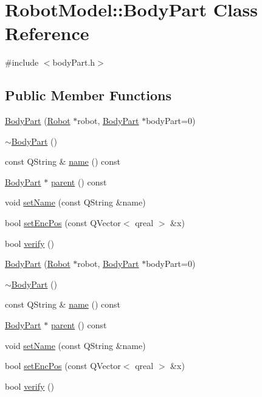 \hypertarget{class_robot_model_1_1_body_part}{
\section{RobotModel::BodyPart Class Reference}
\label{class_robot_model_1_1_body_part}
}


{\ttfamily \#include $<$bodyPart.h$>$}\subsection*{Public Member Functions}
\begin{DoxyCompactItemize}
\item 
\hyperlink{class_robot_model_1_1_body_part_a1f6265932a76d89dc77b0b6185966913}{BodyPart} (\hyperlink{class_robot_model_1_1_robot}{Robot} $\ast$robot, \hyperlink{class_robot_model_1_1_body_part}{BodyPart} $\ast$bodyPart=0)
\item 
\hyperlink{class_robot_model_1_1_body_part_a0d51eaacbf15745175b21bf44f67a92a}{$\sim$BodyPart} ()
\item 
const QString \& \hyperlink{class_robot_model_1_1_body_part_a61b6e309edb55f764400dac2b8659a5f}{name} () const 
\item 
\hyperlink{class_robot_model_1_1_body_part}{BodyPart} $\ast$ \hyperlink{class_robot_model_1_1_body_part_abc2ab2a0e1da50aa7465bc1b92ed3abc}{parent} () const 
\item 
void \hyperlink{class_robot_model_1_1_body_part_ae67c833c817776f9b922d967a2654df2}{setName} (const QString \&name)
\item 
bool \hyperlink{class_robot_model_1_1_body_part_adc934dcfdac5a14fe88dd5a21b9055d7}{setEncPos} (const QVector$<$ qreal $>$ \&x)
\item 
bool \hyperlink{class_robot_model_1_1_body_part_a6b52676f58b9da5bef87ef2fac1a7a94}{verify} ()
\item 
\hyperlink{class_robot_model_1_1_body_part_a215d63b6bed4559e0c54d98e913111c9}{BodyPart} (\hyperlink{class_robot_model_1_1_robot}{Robot} $\ast$robot, \hyperlink{class_robot_model_1_1_body_part}{BodyPart} $\ast$bodyPart=0)
\item 
\hyperlink{class_robot_model_1_1_body_part_a9740eb72ccdaa56e8e91c999a645867f}{$\sim$BodyPart} ()
\item 
const QString \& \hyperlink{class_robot_model_1_1_body_part_a61b6e309edb55f764400dac2b8659a5f}{name} () const 
\item 
\hyperlink{class_robot_model_1_1_body_part}{BodyPart} $\ast$ \hyperlink{class_robot_model_1_1_body_part_abc2ab2a0e1da50aa7465bc1b92ed3abc}{parent} () const 
\item 
void \hyperlink{class_robot_model_1_1_body_part_ae67c833c817776f9b922d967a2654df2}{setName} (const QString \&name)
\item 
bool \hyperlink{class_robot_model_1_1_body_part_aba3f72f8f042af1ef0d275a1a1593fa5}{setEncPos} (const QVector$<$ qreal $>$ \&x)
\item 
bool \hyperlink{class_robot_model_1_1_body_part_a9aac03ba60f71274d0b79af69629eb86}{verify} ()
\end{DoxyCompactItemize}


